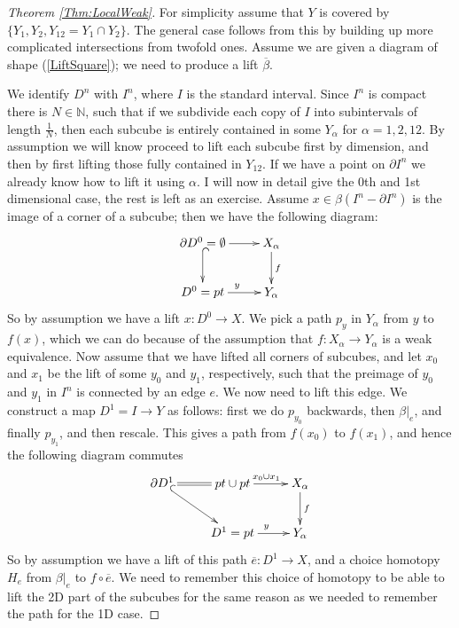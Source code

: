 \documentclass{article}
\newtheorem{proposed work}[theorem]{Proposed Work}
\newcommand{\xymat}[1]{\begin{align*}\xymatrix{ #1}\end{align*}}
\begin{document}
\begin{proof}[Theorem \ref{Thm:LocalWeak}]
For simplicity assume that $Y$ is covered by $\{Y_1,Y_2,Y_{12}=Y_1\cap Y_2\}$. The general case follows from this by building up more complicated intersections from twofold ones. Assume we are given a diagram of shape (\ref{LiftSquare}); we need to produce a lift $\overline{\beta}$. 

We identify $D^n$ with $I^n$, where $I$ is the standard interval. Since $I^n$ is compact there is $N\in \mathbb{N}$, such that if we subdivide each copy of $I$ into subintervals of length $\frac{1}{N}$, then each subcube is entirely contained in some $Y_\alpha$ for $\alpha=1,2,12$. By assumption we will know proceed to lift each subcube first by dimension, and then by first lifting those fully contained in $Y_{12}$. If we have a point on $\partial I^n$ we already know how to lift it using $\alpha$. I will now in detail give the 0th and 1st dimensional case, the rest is left as an exercise. Assume $x\in \beta(I^n-\partial I^n)$ is the image of a corner of a subcube; then we have the following diagram:
\xymat{\partial D^0 =\emptyset \ar[r] \ar@{^{(}->}[d] & X_\alpha \ar[d]^f \\ D^0=pt \ar[r]^y & Y_\alpha }
So by assumption we have a lift $x:D^0 \to X$. We pick a path $p_y$ in $Y_\alpha$ from  $y$ to $f(x)$, which we can do because of the assumption that $f:X_\alpha \to Y_\alpha$ is a weak equivalence. Now assume that we have lifted all corners of subcubes, and let $x_0$ and $x_1$ be the lift of some $y_0$ and $y_1$, respectively, such that the preimage of $y_0$ and $y_1$ in $I^n$ is connected by an edge $e$. We now need to lift this edge. We construct a map $D^1=I \to Y$ as follows: first we do $p_{y_0}$ backwards, then $\beta|_e$, and finally $p_{y_1}$, and then rescale. This gives a path from $f(x_0)$ to $f(x_1)$, and hence the following diagram commutes
\xymat{\partial D^1 \ar@{=}[r]\ar@{^{(}->}[dr]& pt \cup pt \ar[r]^{x_0 \cup x_1}  & X_\alpha \ar[d]^f \\ & D^1=pt \ar[r]^y & Y_\alpha}
So by assumption we have a lift of this path $\overline{e}: D^1\to X$, and a choice homotopy $H_e$ from $\beta|_e$ to $f\circ \overline{e}$. We need to remember this choice of homotopy to be able to lift the 2D part of the subcubes for the same reason as we needed to remember the path for the 1D case.
\end{proof}
\end{document}
